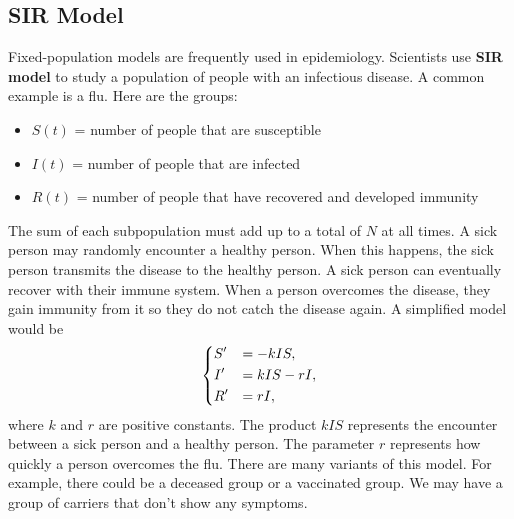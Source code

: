 \documentclass[10pt,letterpaper]{article}
\begin{document}
\subsection*{SIR Model}
Fixed-population models are frequently used in epidemiology. Scientists use \textbf{SIR model} to study a population of people with an infectious disease. A common example is a flu. Here are the groups:
\begin{itemize}
    \item $S(t)$ = number of people that are susceptible 
    \item $I(t)$ = number of people that are infected
    \item $R(t)$ = number of people that have recovered and developed immunity
\end{itemize}
The sum of each subpopulation must add up to a total of $N$ at all times. A sick person may randomly encounter a healthy person. When this happens, the sick person transmits the disease to the healthy person. A sick person can eventually recover with their immune system. When a person overcomes the disease, they gain immunity from it so they do not catch the disease again. A simplified model would be 
$$
\begin{dcases}
    S' &= -kIS,\\
    I' &= kIS - rI,\\
    R' &= rI,
\end{dcases}
$$
where $k$ and $r$ are positive constants. The product $kIS$ represents the encounter between a sick person and a healthy person. The parameter $r$ represents how quickly a person overcomes the flu. There are many variants of this model. For example, there could be a deceased group or a vaccinated group. We may have a group of carriers that don't show any symptoms.
\end{document}
